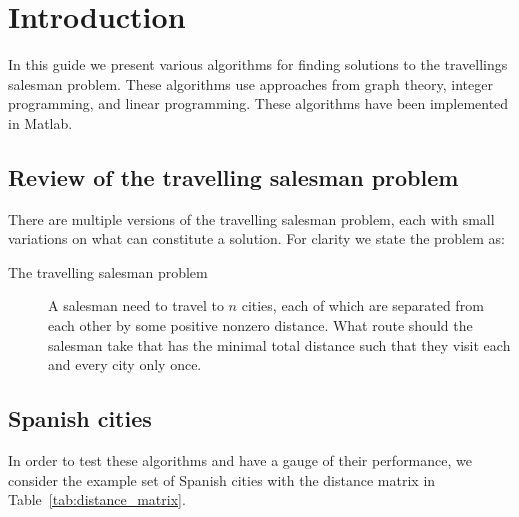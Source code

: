 \section{Introduction}
\label{sec:introduction}

In this guide we present various algorithms for finding solutions to the travellings salesman problem. These algorithms use approaches from graph theory, integer programming, and linear programming. These algorithms have been implemented in Matlab.

\subsection{Review of the travelling salesman problem}
\label{subsec:review_of_tsp}

There are multiple versions of the travelling salesman problem, each with small variations on what can constitute a solution. For clarity we state the problem as:
\begin{description}
\item[The travelling salesman problem] A salesman need to travel to $ n $ cities, each of which are separated from each other by some positive nonzero distance. What route should the salesman take that has the minimal total distance such that they visit each and every city only once.
\end{description}


\subsection{Spanish cities}
\label{subsec:spanish_cities}

In order to test these algorithms and have a gauge of their performance, we consider the example set of Spanish cities with the  distance matrix in Table~\ref{tab:distance_matrix}.

